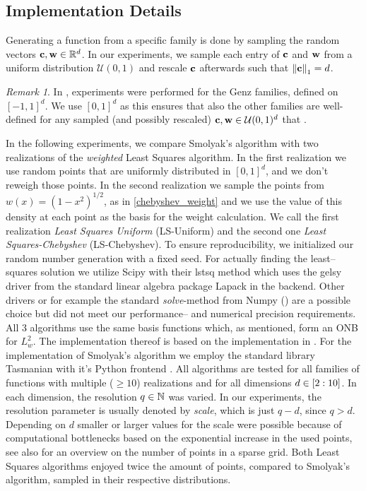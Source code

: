 \documentclass[12pt, oneside]{amsart}
\theoremstyle{definition}
\theoremstyle{remark}
\newtheorem{remark}[thm]{Remark}
\numberwithin{equation}{section}
\begin{document}
\subsection{Implementation Details}

Generating a function from a specific family is done 
by sampling the random vectors $\bfc, \bfw \in\R^d$. In our experiments, we 
sample each entry of $\bfc$ and $\bfw$ from a uniform distribution 
$\mathcal{U}(0,1)$ and rescale $\bfc$ afterwards such that $\norm[1]{\bfc}=d$.

\begin{remark}
	In \cite{BarthelmannHighDim_2000}, experiments were performed for the Genz 
	families, defined on $[-1,1]^d$. We use $[0,1]^d$ as this ensures that also 
	the other families are well-defined for any sampled (and possibly rescaled) 
	$\bfc,\bfw\in\mathcal{U}(0,1)^d$ that .
\end{remark}

In the following experiments, we compare Smolyak's algorithm with two 
realizations of the \emph{weighted} Least Squares algorithm. In the first 
realization we use random points that are uniformly distributed in $[0,1]^d$, 
and we don't reweigh those points. In the second realization we sample the 
points from $w(x) = (1-x^2)^{1/2}$, as in \ref{chebyshev_weight} and we use the 
value of 
this density at each point as the basis for the weight calculation.
We call the first realization \emph{Least Squares Uniform} (LS-Uniform) and the 
second one \emph{Least Squares-Chebyshev} (LS-Chebyshev). 
To ensure reproducibility, we initialized our random number generation with a 
fixed seed.
For actually finding the least--squares solution we utilize Scipy 
\cite{Virtanen_Scipy} with their \textrm{lstsq} method which uses the 
\textrm{gelsy} driver from the standard linear algebra package Lapack 
\cite{lapack99} in the backend.
Other drivers or for example the standard \emph{solve}-method from Numpy 
(\cite{HarrisNumpy_2020}) are a possible choice but did not meet our 
performance-- and numerical precision requirements.
All 3 algorithms use the same basis functions  
which, as mentioned, form an ONB for \(L^2_w\). The implementation thereof is 
based on the implementation in \cite{JuddSmolyak_2014}. For the implementation 
of Smolyak's algorithm we employ the standard library Tasmanian with it's 
Python frontend 
\cite{stoyanov2015tasmanian,stoyanov2016dynamically,stoyanov2018adaptive,morrow2019method,doecode_6305}.
All algorithms are tested for all families of functions with multiple (\(\geq 
10\)) realizations and for all dimensions $d\in \indexset[2]{10}$. In 
each dimension, the resolution $q\in\N$ was varied. In our experiments, the 
resolution parameter is usually denoted by \emph{scale}, which is just $q-d$, 
since $q>d$. Depending on $d$ smaller or larger values for the scale were 
possible because of computational bottlenecks based on the exponential increase 
in the used points, see also \cite{BurkardtCounting_2014} for an overview on 
the number of points in a sparse grid. Both Least Squares algorithms enjoyed 
twice the amount of points, compared to Smolyak's algorithm, sampled in their 
respective distributions.
\end{document}
